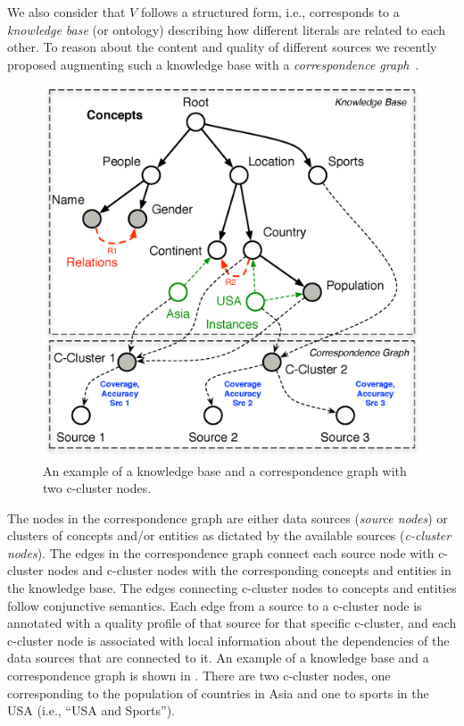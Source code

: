 \documentclass{vldb}
\begin{document}
We also consider that $V$ follows a structured form, i.e., corresponds to a {\em knowledge base} (or ontology) describing how different literals are related to each other. To reason about the content and quality of different sources we recently proposed augmenting such a knowledge base with a {\em correspondence graph}~\cite{rekatsinas:2015}. 
\begin{figure}[h]
	\begin{center}
	\includegraphics[clip,scale=0.25]{fig/kgcg}
	\vspace{-10pt}
	\caption{An example of a knowledge base and a correspondence graph with two c-cluster nodes.}
	\label{fig:kgcg}
	\vspace{-15pt}
	\end{center}
\end{figure}

The nodes in the correspondence graph are either data sources ({\em source nodes}) or clusters of concepts and/or entities as dictated by the available sources ({\em c-cluster nodes}). The edges in the correspondence graph connect each source node with c-cluster nodes and c-cluster nodes with the corresponding concepts and entities in the knowledge base.  The edges connecting c-cluster nodes to concepts and entities follow conjunctive semantics. Each edge from a source to a c-cluster node is annotated with a quality profile of that source for that specific c-cluster, and each c-cluster node is associated with local information about the dependencies of the data sources that are connected to it. An example of a knowledge base and a correspondence graph is shown in . There are two c-cluster nodes, one corresponding to the population of countries in Asia and one to sports in the USA (i.e., ``USA and Sports''). 
\end{document}

